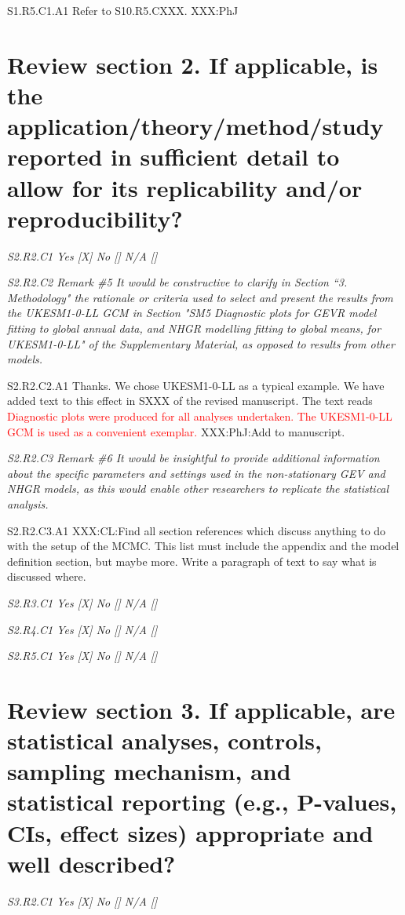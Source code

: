 \documentclass[a4paper,10pt]{article}
\newcommand{\ed}[1]{\textcolor{red}{#1}}
\begin{document}
	S1.R5.C1.A1 Refer to S10.R5.CXXX. XXX:PhJ
	
	\section*{Review section 2. If applicable, is the application/theory/method/study reported in sufficient detail to allow for its replicability and/or reproducibility?}
	
	\emph{S2.R2.C1 Yes [X] No [] N/A []}
		
	\emph{S2.R2.C2 Remark \#5 It would be constructive to clarify in Section “3. Methodology" the rationale or criteria used to select and present the results from the UKESM1-0-LL GCM in Section "SM5 Diagnostic plots for GEVR model fitting to global annual data, and NHGR modelling fitting to global means, for UKESM1-0-LL" of the Supplementary Material, as opposed to results from other models.}
	
	S2.R2.C2.A1 Thanks. We chose UKESM1-0-LL as a typical example. We have added text to this effect in SXXX of the revised manuscript. The text reads \ed{Diagnostic plots were produced for all analyses undertaken. The UKESM1-0-LL GCM is used as a convenient exemplar.} XXX:PhJ:Add to manuscript.
		
	\emph{S2.R2.C3 Remark \#6 It would be insightful to provide additional information about the specific parameters and settings used in the non-stationary GEV and NHGR models, as this would enable other researchers to replicate the statistical analysis.}
	
	S2.R2.C3.A1 XXX:CL:Find all section references which discuss anything to do with the setup of the MCMC. This list must include the appendix and the model definition section, but maybe more. Write a paragraph of text to say what is discussed where.
	
	\emph{S2.R3.C1 Yes [X] No [] N/A []}

	\emph{S2.R4.C1 Yes [X] No [] N/A []}

	\emph{S2.R5.C1 Yes [X] No [] N/A []}

	\section*{Review section 3. If applicable, are statistical analyses, controls, sampling mechanism, and statistical reporting (e.g., P-values, CIs, effect sizes) appropriate and well described?}

	\emph{S3.R2.C1 Yes [X] No [] N/A []}
	
\end{document}
